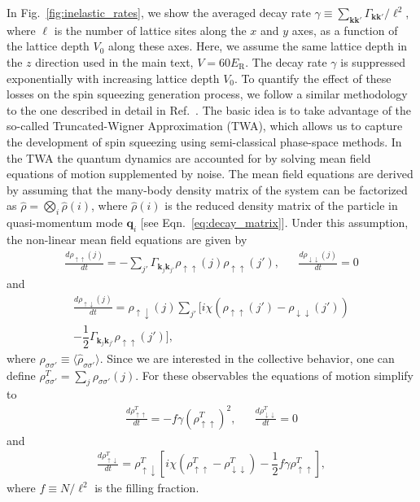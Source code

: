 \documentclass[aps,prx,superscriptaddress,notitlepage,twocolumn,longbibliography]{revtex4-2}
\newcommand{\f}[2]{\dfrac{#1}{#2}} %
\renewcommand{\sp}[1]{\left[#1\right]} %
\newcommand{\up}{\uparrow}
\newcommand{\dn}{\downarrow}
\begin{document}
In Fig.~\ref{fig:inelastic_rates}, we show the averaged decay rate $\gamma\equiv\sum_{{\bm k}{\bm k'}}\Gamma_{{\bm k}{\bm k'}}/\ell^2$, where $\ell$ is the number of lattice sites along the $x$ and $y$ axes, as a function of the lattice depth $V_0$ along these axes.
Here, we assume the same lattice depth in the $z$ direction used in the main text, $V=60E_{\text{R}}$.
The decay rate $\gamma$ is suppressed exponentially with increasing lattice depth  $V_0$.
To quantify the effect of these losses on the spin squeezing generation process, we follow a similar methodology to the one described in detail in Ref.~\cite{rey2014probing}.
The basic idea is to take advantage of the so-called Truncated-Wigner Approximation (TWA)\cite{polkovnikov2010phase, schachenmayer2015manybody}, which allows us to capture the development of spin squeezing using semi-classical phase-space methods.
In the TWA the quantum dynamics are accounted for by solving mean field equations of motion supplemented by noise.
The mean field equations are  derived by assuming that the many-body density matrix of the system can be factorized as
$\hat{\rho}= \bigotimes_{i} \hat{\rho}({i})$, where $\hat{\rho}(i)$ is the reduced density matrix of the  particle in quasi-momentum  mode  ${\bm q}_i$ [see Eqn.~\eqref{eq:decay_matrix}].
Under this assumption, the non-linear mean field equations are given by
\begin{align}
  \frac{d\rho_{\up\up}(j)}{dt}
  = -\sum_{j'}\Gamma_{{\bm k}_j{\bm k}_{j'}}
  \rho_{\up\up}(j) \rho_{\up\up}(j'),
  &&
  \frac{d\rho_{\dn \dn}(j)}{dt}=0
\end{align}
and
\begin{multline}
  \frac{d\rho_{\up\dn}(j)}{dt}
  = \rho_{\up\dn}(j) \sum_{j'}
  \bigg[i\chi(\rho_{\up\up}(j')-\rho_{\dn\dn}(j')) \\
  - \f12 \Gamma_{{\bm k}_j{\bm k}_{j'}} \rho_{\up\up}(j')\bigg],
\end{multline}
where $\rho_{\sigma\sigma'}\equiv\langle\hat{\rho}_{\sigma\sigma'}\rangle$.
Since we are interested in the collective behavior, one can define $\rho_{\sigma\sigma'}^T=\sum_j \rho_{\sigma\sigma'}(j)$. For these observables the equations of motion simplify to
\begin{align}
  \frac{d\rho_{\up\up}^T}{dt} = -f\gamma  (\rho_{\up\up}^T)^2,
  &&
  \frac{d\rho_{\dn \dn}^T}{dt} = 0
\end{align}
and
\begin{align}
  \frac{d\rho_{\up\dn}^T}{dt}
  = \rho_{\up\dn}^T
  \sp{i\chi(\rho_{\up\up}^T-\rho_{\dn\dn}^T)
    - \f12 f\gamma \rho_{\up\up}^T},
\end{align}
where $f\equiv N/\ell^2$ is the filling fraction.
\end{document}
